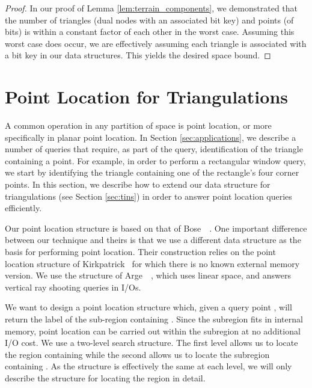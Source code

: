 \begin{proof}
In our proof of Lemma \ref{lem:terrain_components}, we demonstrated 
that the number of triangles (dual nodes with an associated  
bit key) and points (of  bits) is within a constant factor 
of each other in the worst case. 
Assuming this worst case does occur, we are effectively assuming each 
triangle is associated with a  bit key in our data structures. 
This yields the desired space bound.
\end{proof}


\section{Point Location for Triangulations}\label{sec:point_location}



A common operation in any partition of space is point location, or more
specifically in  planar point location.
In Section \ref{sec:applications}, we describe a number of queries
that require, as part of the query, identification of the triangle 
containing a point. 
For example, in order to perform a rectangular window query, we start by
identifying the triangle containing one of the rectangle's four
corner points.
In this section, we describe how to extend our data structure
for triangulations (see Section \ref{sec:tins}) in order to answer point 
location queries efficiently.

Our point location structure is based on that of 
Bose~\etal~\cite{DBLP:journals/talg/BoseCHMM12}.
One important difference between our technique and theirs is that we use
a different data structure as the basis for performing point location.
Their construction relies on the point location structure of 
Kirkpatrick~\cite{DBLP:journals/siamcomp/Kirkpatrick83} for which there is no
known external memory version.  
We use the structure of Arge~\etal~\cite{DBLP:conf/alenex/ArgeDT03},
which uses linear space, and answers vertical ray shooting queries in 
 I/Os.

We want to design a point location structure which, given a query point , 
will return the label of the sub-region containing . 
Since the subregion fits in internal memory, point location can be carried
out within the subregion at no additional I/O cost.
We use a two-level search structure.  
The first level allows us to locate the region containing  while the 
second allows us to locate the subregion containing .
As the structure is effectively the same at each level, we will only 
describe the structure for locating the region in detail.

